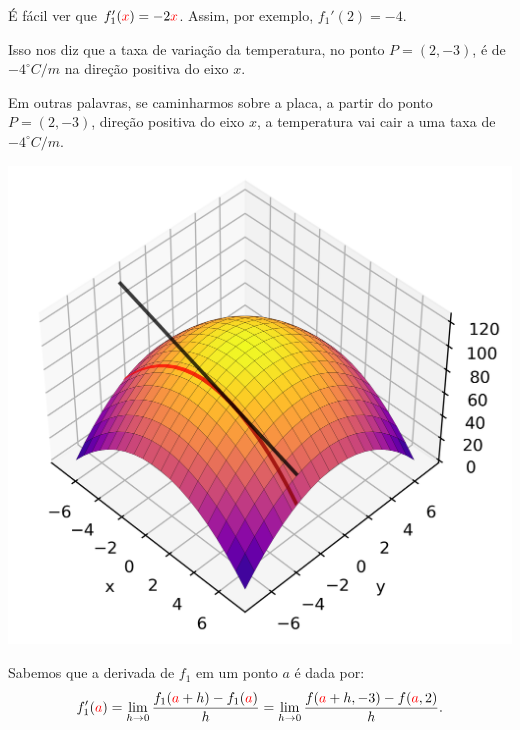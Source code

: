 \begin{frame}
	É fácil ver que $f_1'({\color{red}x})=-2{\color{red}x}$. Assim, por exemplo, $f_1'(2)=-4$.
	\medskip 
	
	 Isso nos diz que a {\color{red}taxa de variação da temperatura}, no ponto $P=(2,-3)$, é de $-4^\circ C/m$ na {\color{blue}direção positiva do eixo $x$}.
	\medskip
	
	Em outras palavras, se caminharmos sobre a placa, a partir do ponto $P=(2,-3)$, {\color{blue}direção positiva do eixo $x$}, {\color{red}a temperatura vai cair a uma taxa de $-4^\circ C/m$.}
	
\begin{center}
	\includegraphics[scale=0.55]{figuras/der-parc2-3.png}
\end{center}
\end{frame}





\begin{frame}[label=der-parciais]
Sabemos que a derivada de $f_1$ em um ponto {\color{red} $a$} é dada por:
\[f_1'({\color{red}a})=\lim\limits_{h\to0}\frac{f_1({\color{red}a}+h)-f_1({\color{red}a})}{h}=\lim\limits_{h\to0}\frac{f({\color{red}a}+h,-3)-f({\color{red}a},2)}{h}.\]
\end{frame}



